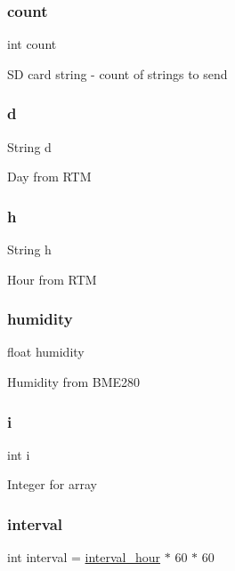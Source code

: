 \subsubsection{\texorpdfstring{count}{count}}
{\footnotesize\ttfamily int count}

SD card string -\/ count of strings to send \mbox{\label{_w_s_8ino_a7e3f4a5179b8e7fc0d3cee2a12bb3f44}} 
\subsubsection{\texorpdfstring{d}{d}}
{\footnotesize\ttfamily String d}

Day from R\+TM \mbox{\label{_w_s_8ino_a5977e838367785a7176dc7d4106df5e3}} 
\subsubsection{\texorpdfstring{h}{h}}
{\footnotesize\ttfamily String h}

Hour from R\+TM \mbox{\label{_w_s_8ino_a6a87b2b0cff24d38b367ccd34843a206}} 
\subsubsection{\texorpdfstring{humidity}{humidity}}
{\footnotesize\ttfamily float humidity}

Humidity from B\+M\+E280 \mbox{\label{_w_s_8ino_acb559820d9ca11295b4500f179ef6392}} 
\subsubsection{\texorpdfstring{i}{i}}
{\footnotesize\ttfamily int i}

Integer for array \mbox{\label{_w_s_8ino_ae0c690118932b32ef40a74bb6a259acd}} 
\subsubsection{\texorpdfstring{interval}{interval}}
{\footnotesize\ttfamily int interval = \hyperlink{_w_s_8ino_a4e07ce7aef83b2e94bd353d77029423e}{interval\+\_\+hour} $\ast$ 60 $\ast$ 60}

